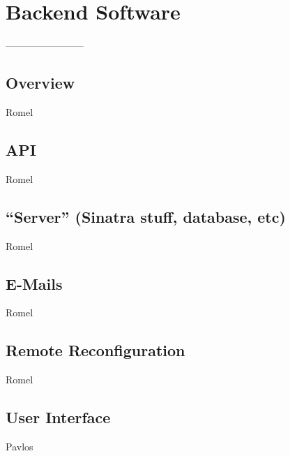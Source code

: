 \chapter{Backend Software}
------------------------

\section{Overview}
Romel

\section{API}
Romel

\section{``Server'' (Sinatra stuff, database, etc)}
Romel

\section{E-Mails}
Romel

\section{Remote Reconfiguration}
Romel

\section{User Interface}
Pavlos